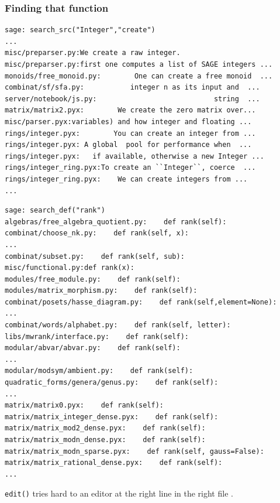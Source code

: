 \documentclass[11pt,blackandwhite]{beamer}
\newcommand{\code}{\lstinline}
\begin{document}
\begin{frame}

\frametitle{Finding that function}

\begin{scriptsize}
\begin{lstlisting}
sage: search_src("Integer","create")
...
misc/preparser.py:We create a raw integer.
misc/preparser.py:first one computes a list of SAGE integers ...
monoids/free_monoid.py:        One can create a free monoid  ...
combinat/sf/sfa.py:           integer n as its input and  ...
server/notebook/js.py:                            string  ...
matrix/matrix2.pyx:        We create the zero matrix over...
misc/parser.pyx:variables) and how integer and floating ...
rings/integer.pyx:        You can create an integer from ...
rings/integer.pyx: A global  pool for performance when  ...
rings/integer.pyx:   if available, otherwise a new Integer ...
rings/integer_ring.pyx:To create an ``Integer``, coerce  ...
rings/integer_ring.pyx:    We can create integers from ...
...
\end{lstlisting}
\end{scriptsize}

\framebreak

\begin{scriptsize}
\begin{lstlisting}
sage: search_def("rank")
algebras/free_algebra_quotient.py:    def rank(self):
combinat/choose_nk.py:    def rank(self, x):
...
combinat/subset.py:    def rank(self, sub):
misc/functional.py:def rank(x):
modules/free_module.py:    def rank(self):
modules/matrix_morphism.py:    def rank(self):
combinat/posets/hasse_diagram.py:    def rank(self,element=None):
...
combinat/words/alphabet.py:    def rank(self, letter):
libs/mwrank/interface.py:    def rank(self):
modular/abvar/abvar.py:    def rank(self):
...
modular/modsym/ambient.py:    def rank(self):
quadratic_forms/genera/genus.py:    def rank(self):
...
matrix/matrix0.pyx:    def rank(self):
matrix/matrix_integer_dense.pyx:    def rank(self):
matrix/matrix_mod2_dense.pyx:    def rank(self):
matrix/matrix_modn_dense.pyx:    def rank(self):
matrix/matrix_modn_sparse.pyx:    def rank(self, gauss=False):
matrix/matrix_rational_dense.pyx:    def rank(self):
...
\end{lstlisting}
\end{scriptsize}

\framebreak

\code{edit()} tries hard to an editor at the right line in the right file
\texttrademark.


\end{frame}
\end{document}
